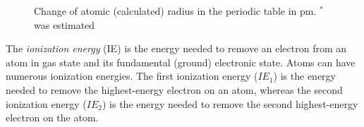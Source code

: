 \documentclass[main.tex]{subfiles}
\begin{document}
\begin{description}
\begin{figure}
\caption{Change of atomic (calculated) radius in the periodic table in pm. $^*$ was estimated}
\end{figure}


\item[\docfilehook{Ionization Energy}{ Ionization Energy}] The \emph{ionization energy} (IE) is the energy needed to remove an electron from an atom in gas state and its fundamental (ground) electronic state. Atoms can have numerous ionization energies. The first ionization energy ($IE_1$) is the energy needed to remove the highest-energy electron on an atom, whereas the second ionization energy ($IE_2$) is the energy needed to remove the second highest-energy electron on the atom. 


\end{description}
\end{document}
